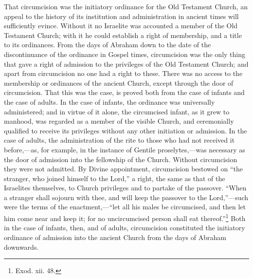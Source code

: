 \documentclass[]{book}
\begin{document}
That circumcision was the initiatory ordinance for the Old Testament Church, an appeal to the history of its institution and administration in ancient times will sufficiently evince. Without it no Israelite was accounted a member of the Old Testament Church; with it he could establish a right of membership, and a title to its ordinances. From the days of Abraham down to the date of the discontinuance of the ordinance in Gospel times, circumcision was the only thing that gave a right of admission to the privileges of the Old Testament Church; and apart from circumcision no one had a right to these. There was no access to the membership or ordinances of the ancient Church, except through the door of circumcision. That this was the case, is proved both from the case of infants and the case of adults. In the case of infants, the ordinance was universally administered; and in virtue of it alone, the circumcised infant, as it grew to manhood, was regarded as a member of the visible Church, and ceremonially qualified to receive its privileges without any other initiation or admission. In the case of adults, the administration of the rite to those who had not received it before,---as, for example, in the instance of Gentile proselytes,---was necessary as the door of admission into the fellowship of the Church. Without circumcision they were not admitted. By Divine appointment, circumcision bestowed on ``the stranger, who joined himself to the Lord,'' a right, the same as that of the Israelites themselves, to Church privileges and to partake of the passover. ``When a stranger shall sojourn with thee, and will keep the passover to the Lord,''---such were the terms of the enactment,---``let all his males be circumcised, and then let him come near and keep it; for no uncircumcised person shall eat thereof.''\footnote{Exod. xii. 48.} Both in the case of infants, then, and of adults, circumcision constituted the initiatory ordinance of admission into the ancient Church from the days of Abraham downwards.
\end{document}
